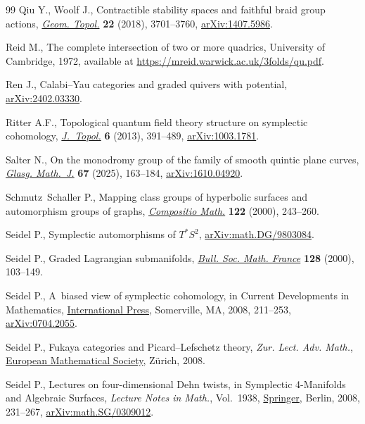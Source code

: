 \documentclass[10pt,a4paper]{amsart}
\theoremstyle{definition}
\numberwithin{equation}{section}
\begin{document}
\begin{thebibliography}{99}
Qiu Y., Woolf J., Contractible stability spaces and faithful braid group
 actions, \href{https://doi.org/10.2140/gt.2018.22.3701}{\textit{Geom.
 Topol.}} \textbf{22} (2018), 3701--3760,
 \href{http://arxiv.org/abs/1407.5986}{arXiv:1407.5986}.

Reid M., The complete intersection of two or more quadrics, {U}niversity of
 Cambridge, 1972, available at
 \url{https://mreid.warwick.ac.uk/3folds/qu.pdf}.

Ren J., Calabi--{Y}au categories and graded quivers with potential,
 \href{http://arxiv.org/abs/2402.03330}{arXiv:2402.03330}.

Ritter A.F., Topological quantum field theory structure on symplectic
 cohomology, \href{https://doi.org/10.1112/jtopol/jts038}{\textit{J.~Topol.}}
 \textbf{6} (2013), 391--489,
 \href{http://arxiv.org/abs/1003.1781}{arXiv:1003.1781}.

Salter N., On the monodromy group of the family of smooth quintic plane curves,
 \href{https://doi.org/10.1017/S0017089524000284}{\textit{Glasg. Math.~J.}}
 \textbf{67} (2025), 163--184,
 \href{http://arxiv.org/abs/1610.04920}{arXiv:1610.04920}.

Schmutz~Schaller P., Mapping class groups of hyperbolic surfaces and
 automorphism groups of graphs,
 \href{https://doi.org/10.1023/A:1002672721132}{\textit{Compositio Math.}}
 \textbf{122} (2000), 243--260.

Seidel P., Symplectic automorphisms of ${T}^*{S}^2$,
 \href{http://arxiv.org/abs/math.DG/9803084}{arXiv:math.DG/9803084}.


Seidel P., Graded {L}agrangian submanifolds,
 \href{https://doi.org/10.24033/bsmf.2365}{\textit{Bull. Soc. Math. France}}
 \textbf{128} (2000), 103--149.

Seidel P., A~biased view of symplectic cohomology, in Current Developments in
 Mathematics,
 \href{https://doi.org/10.4310/CDM.2006.v2006.n1.a4}{International Press},
 Somerville, MA, 2008, 211--253,
 \href{http://arxiv.org/abs/0704.2055}{arXiv:0704.2055}.

Seidel P., Fukaya categories and {P}icard--{L}efschetz theory, \textit{Zur. Lect. Adv.
 Math.}, \href{https://doi.org/10.4171/063}{European Mathematical Society},
 Z\"urich, 2008.

Seidel P., Lectures on four-dimensional {D}ehn twists, in Symplectic
 4-Manifolds and Algebraic Surfaces, \textit{Lecture Notes in Math.}, Vol.~1938, \href{https://doi.org/10.1007/978-3-540-78279-7_4}{Springer}, Berlin,
 2008, 231--267,
 \href{http://arxiv.org/abs/math.SG/0309012}{arXiv:math.SG/0309012}.


\end{thebibliography}
\end{document}
